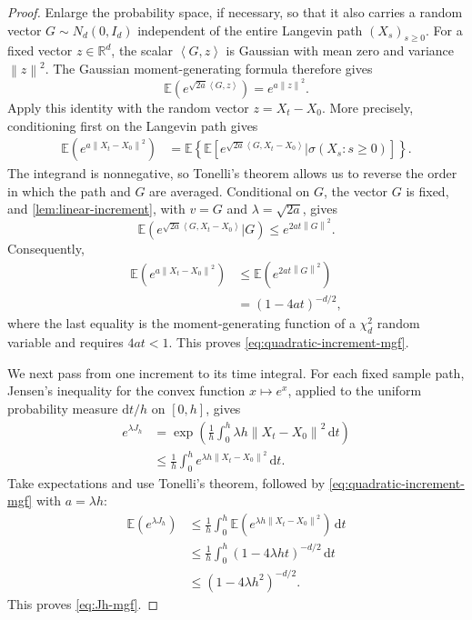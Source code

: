 \documentclass[11pt]{article}
\newcommand{\R}{\mathbb R}
\newcommand{\E}{\mathbb E}
\newcommand{\ip}[2]{\left\langle #1,#2\right\rangle}
\newcommand{\norm}[1]{\left\lVert #1\right\rVert}
\newcommand{\1}{\mathbf 1}
\newcommand{\df}{\mathrm{d}}
\begin{document}
	\begin{proof}
		Enlarge the probability space,
		if necessary, so that it also carries a random vector
		\(G\sim N_d(0,I_d)\) independent of the entire Langevin path
		\((X_s)_{s\geq0}\).  For a fixed vector \(z\in\R^d\), the scalar
		\(\ip{G}{z}\) is Gaussian with mean zero and variance \(\norm{z}^2\).
		The Gaussian moment-generating formula therefore gives
		\begin{equation*}
			\E\!
			\left(
			e^{\sqrt{2a}\ip{G}{z}}
			\right)
			=e^{a\norm{z}^2}.
		\end{equation*}
		Apply this identity with the random vector \(z=X_t-X_0\).  More precisely,
		conditioning first on the Langevin path gives
		\begin{align*}
			\E \left(e^{a\norm{X_t-X_0}^2} \right)
			&=\E\left\{
			\E\left[
			e^{\sqrt{2a}\ip{G}{X_t-X_0}}
			\mathrel{\big|}\sigma(X_s:s\geq0)
			\right]
			\right\}.
		\end{align*}
		The integrand is nonnegative, so Tonelli's theorem allows us to reverse the
		order in which the path and \(G\) are averaged.  Conditional on \(G\), the
		vector \(G\) is fixed, and \cref{lem:linear-increment}, with
		\(v=G\) and \(\lambda=\sqrt{2a}\), gives
		\[
		\E\left(
		e^{\sqrt{2a}\ip{G}{X_t-X_0}}
		\mathrel{\big|}G
		\right)
		\leq e^{2at\norm{G}^2}.
		\]
		Consequently,
		\begin{equation*}
			\begin{aligned}
				\E \left(e^{a\norm{X_t-X_0}^2} \right)
				&\leq \E \left(e^{2at\norm{G}^2} \right)\\
				&=(1-4at)^{-d/2},
			\end{aligned}
		\end{equation*}
		where the last equality is the moment-generating function of a
		\(\chi_d^2\) random variable and requires \(4at<1\).  This proves
		\eqref{eq:quadratic-increment-mgf}.
		
		We next pass from one increment to its time integral.  For each fixed sample
		path, Jensen's inequality for the convex function \(x\mapsto e^x\), applied
		to the uniform probability measure \(\df t/h\) on \([0,h]\), gives
		\begin{align*}
			e^{\lambda J_h}
			&=\exp\left(
			\frac1h\int_0^h \lambda h\norm{X_t-X_0}^2\,\df t
			\right)\\
			&\leq
			\frac1h\int_0^h
			e^{\lambda h\norm{X_t-X_0}^2}\,\df t.
		\end{align*}
		Take expectations and use Tonelli's theorem, followed by
		\eqref{eq:quadratic-increment-mgf} with \(a=\lambda h\):
		\begin{align*}
			\E (e^{\lambda J_h})
			&\leq
			\frac1h\int_0^h
			\E (e^{\lambda h\norm{X_t-X_0}^2}) \,\df t\\
			&\leq
			\frac1h\int_0^h(1-4\lambda ht)^{-d/2}\,\df t\\
			&\leq(1-4\lambda h^2)^{-d/2}.
		\end{align*}
		This proves \eqref{eq:Jh-mgf}.
		

\end{proof}
\end{document}
